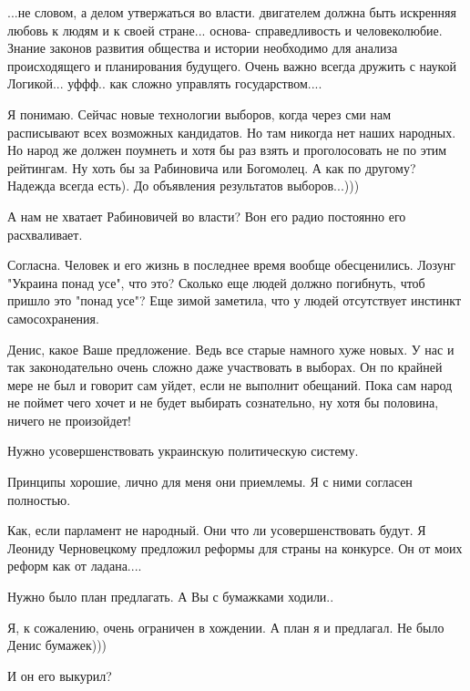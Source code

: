 \begin{itemize}

...не словом, а делом утвержаться во власти. двигателем должна быть искренняя
любовь к людям и к своей стране... основа- справедливость и человеколюбие.
Знание законов развития общества и истории необходимо для анализа происходящего
и планирования будущего. Очень важно всегда дружить с наукой Логикой... уффф..
как сложно управлять государством....

Я понимаю. Сейчас новые технологии выборов, когда через сми нам расписывают
всех возможных кандидатов. Но там никогда нет наших народных. Но народ же
должен поумнеть и хотя бы раз взять и проголосовать не по этим рейтингам. Ну
хоть бы за Рабиновича или Богомолец. А как по другому? Надежда всегда есть). До
объявления результатов выборов...)))


А нам не хватает Рабиновичей во власти? Вон его радио постоянно его расхваливает.


Согласна. Человек и его жизнь в последнее время вообще обесценились. Лозунг
"Украина понад усе", что это? Сколько еще людей должно погибнуть, чтоб пришло
это "понад усе"? Еще зимой заметила, что у людей отсутствует инстинкт
самосохранения.



Денис, какое Ваше предложение. Ведь все старые намного хуже новых. У нас и так
законодательно очень сложно даже участвовать в выборах. Он по крайней мере не
был и говорит сам уйдет, если не выполнит обещаний. Пока сам народ не поймет
чего хочет и не будет выбирать сознательно, ну хотя бы половина, ничего не
произойдет!

Нужно усовершенствовать украинскую политическую систему.

Принципы хорошие, лично для меня они приемлемы. Я с ними согласен полностью.


Как, если парламент не народный. Они что ли усовершенствовать будут. Я Леониду
Черновецкому предложил реформы для страны на конкурсе. Он от моих реформ как от
ладана....

Нужно было план предлагать. А Вы с бумажками ходили..

Я, к сожалению, очень ограничен в хождении. А план я и предлагал. Не было Денис бумажек)))

И он его выкурил?


\end{itemize}
